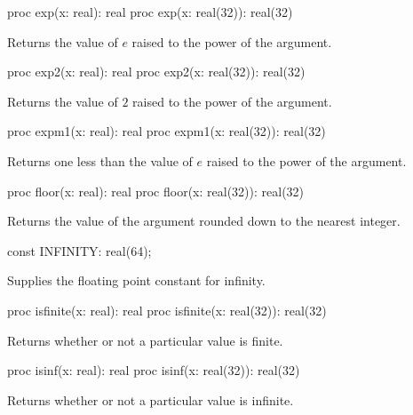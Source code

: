 \begin{protohead}
proc exp(x: real): real
proc exp(x: real(32)): real(32)
\end{protohead}
\begin{protobody}
Returns the value of $e$ raised to the power of the argument.
\end{protobody}

\begin{protohead}
proc exp2(x: real): real
proc exp2(x: real(32)): real(32)
\end{protohead}
\begin{protobody}
Returns the value of $2$ raised to the power of the argument.
\end{protobody}

\begin{protohead}
proc expm1(x: real): real
proc expm1(x: real(32)): real(32)
\end{protohead}
\begin{protobody}
Returns one less than the value of $e$ raised to the power of the argument.
\end{protobody}

\begin{protohead}
proc floor(x: real): real
proc floor(x: real(32)): real(32)
\end{protohead}
\begin{protobody}
Returns the value of the argument rounded down to the nearest integer.
\end{protobody}

\begin{protohead}
const INFINITY: real(64);
\end{protohead}
\begin{protobody}
Supplies the floating point constant for infinity.
\end{protobody}

\begin{protohead}
proc isfinite(x: real): real
proc isfinite(x: real(32)): real(32)
\end{protohead}
\begin{protobody}
Returns whether or not a particular value is finite.
\end{protobody}

\begin{protohead}
proc isinf(x: real): real
proc isinf(x: real(32)): real(32)
\end{protohead}
\begin{protobody}
Returns whether or not a particular value is infinite.
\end{protobody}

